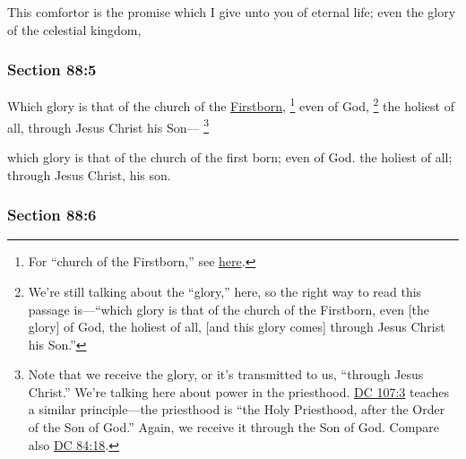 		\begin{framed}
		\scriptsize
			\begin{compactdesc}
				\item[JSP] This comfortor is the promise which I give unto you of eternal life; even the glory of the celestial kingdom,
			\end{compactdesc}
		\end{framed}

	\subsubsection{Section 88:5} %
		\label{DC88-5}

		Which glory is that of the church of the \hyperref[FIRSTBORN]{Firstborn},%
			\footnote{%
				For ``church of the Firstborn,'' see \hyperref[CHURCH-PHRASES]{here}.
				}
		even of God,%
			\footnote{%
				We're still talking about the ``glory,'' here, so the right way to read this passage is---``which glory is that of the church of the Firstborn, even [the glory] of God, the holiest of all, [and this glory comes] through Jesus Christ his Son.''
				}
		the holiest of all, through Jesus Christ his Son---%
			\footnote{%
				Note that we receive the glory, or it's transmitted to us, ``through Jesus Christ.'' We're talking here about power in the priesthood. \hyperref[DC107-3]{DC 107:3} teaches a similar principle---the priesthood is ``the Holy Priesthood, after the Order of the Son of God.'' Again, we receive it through the Son of God. Compare also \hyperref[DC84-18]{DC 84:18}.
				}

		\begin{framed}
		\scriptsize
			\begin{compactdesc}
				\item[JSP] which glory is that of the church of the first born; even of God. the holiest of all; through Jesus Christ, his son.
			\end{compactdesc}
		\end{framed}

	\subsubsection{Section 88:6} %
		\label{DC88-6}

